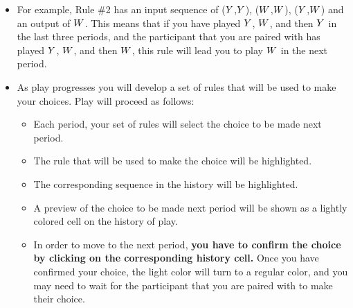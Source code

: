 \documentclass[11pt]{article}
\newcommand{\dblbkt}[1]{}
\begin{document}
\begin{itemize}
\item \dblbkt{1} For example, Rule \#2 has an input sequence of \dblbkt{1} ($Y$,$Y$), \dblbkt{1}($W$,$W$), \dblbkt{1}($Y$,$W$) and an output of \dblbkt{1}$W$.  This means that if you have played \dblbkt{1}$Y$, $W$, and then $Y$ in the last three periods, and the participant that you are paired with has played \dblbkt{1}$Y$, $W$, and then $W$, this rule will lead you to play \dblbkt{1}$W$ in the next period.


\item As play progresses you will develop a set of rules that will be used to make your choices. Play will proceed as follows:  
\begin{itemize}
\item Each period, \dblbkt{1}your set of rules will select the choice to be made next period. 
\item The \dblbkt{1} rule that will be used to make the choice will be highlighted.
\item The corresponding \dblbkt{1} sequence in the history will be highlighted.
\item A \dblbkt{1} preview of the choice to be made next period will be shown as a lightly colored cell on the history of play.
\item In order to move to the next period, {\bf you have to confirm the choice by clicking on the corresponding history cell.}  \dblbkt{1}Once you have confirmed your choice, the light color will turn to a regular color, and you may need to wait for the participant that you are paired with to make their choice. \dblbkt{slnc 5000}\dblbkt{1}
\end{itemize}



\end{itemize}
\end{document}
